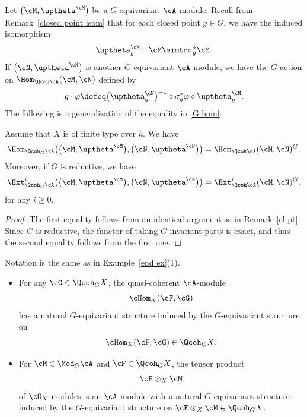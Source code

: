 Let $\big(\cM,\uptheta^{\cM}\big)$ be a $G$-equivariant $\cA$-module. Recall from Remark~\ref{closed point isom} that for each closed point $g\in G$, we have the induced isomorphism
\begin{gather*}
\uptheta_g^{\cM}\colon\ \cM\simto \sigma_g^*\cM.
\end{gather*}
If $\big(\cN,\uptheta^{\cN}\big)$ is another $G$-equivariant $\cA$-module, we have the $G$-action on $\Hom_{\Qcoh\cA}(\cM,\cN)$ defined by
\begin{gather*}
g\cdot\varphi\defeq\big(\uptheta^{\cN}_g\big)^{-1}\circ\sigma_g^*\varphi\circ\uptheta^{\cM}_g.
\end{gather*}
The following is a generalization of the equality in \eqref{G hom}.
\begin{prop}\label{G hom 2}
Assume that $X$ is of finite type over $k$. We have
\begin{gather*}
\Hom_{\Qcoh_G\cA}\big(\big(\cM,\uptheta^{\cM}\big),\big(\cN,\uptheta^{\cN}\big)\big) =\Hom_{\Qcoh\cA}(\cM,\cN)^G.
\end{gather*}
Moreover, if $G$ is reductive, we have
\begin{gather*}
\Ext_{\Qcoh_G\cA}^i\big(\big(\cM,\uptheta^{\cM}\big),\big(\cN,\uptheta^{\cN}\big)\big) =\Ext_{\Qcoh\cA}^i(\cM,\cN)^G.
\end{gather*}
for any $i\geq0$.
\begin{proof}
The first equality follows from an identical argument as in Remark~\ref{cl pt}. Since $G$ is reductive, the functor
of taking $G$-invariant parts is exact, and thus the second equality follows from the first one.
\end{proof}
\end{prop}

\begin{exa} %
Notation is the same as in Example~\ref{end ex}(1).

\begin{itemize}\itemsep=0pt
\item[$1.$] For any $\cG\in \Qcoh_GX$, the quasi-coherent $\cA$-module \begin{gather*}\cHom_X(\cF,\cG)\end{gather*} has a natural $G$-equivariant structure induced by the $G$-equivariant structure on
 \begin{gather*}
 \cHom_X(\cF,\cG)\in \Qcoh_GX.
 \end{gather*}


\item[$2.$] For $\cM\in \Mod_G\cA$ and $\cF\in \Qcoh_GX$, the tensor product \begin{gather*}\cF\otimes_X \cM\end{gather*} of $\cO_X$-modules is an $\cA$-module with a natural $G$-equivariant structure induced by the $G$-equivariant structure on $\cF\otimes_X \cM\in \Qcoh_GX$.
\end{itemize}
\end{exa}

